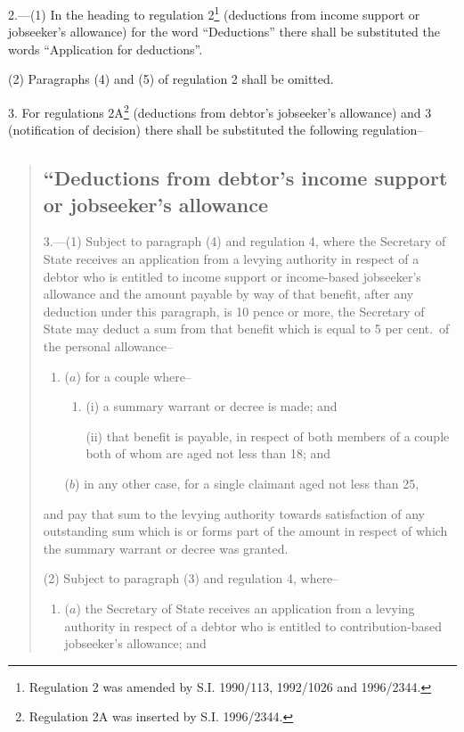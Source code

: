 \documentclass[12pt,a4paper]{article}
\begin{document}
2.---(1)  In the heading to regulation 2\footnote{\frenchspacing Regulation 2 was amended by S.I. 1990/113, 1992/1026 and 1996/2344.} (deductions from income support or jobseeker’s allowance) for the word “Deductions” there shall be substituted the words “Application for deductions”.

(2) Paragraphs (4) and (5) of regulation 2 shall be omitted.

\medskip

3.  For regulations 2A\footnote{\frenchspacing Regulation 2A was inserted by S.I. 1996/2344.} (deductions from debtor’s jobseeker’s allowance) and 3 (notification of decision) there shall be substituted the following regulation–
\begin{quotation}
\subsection*{“Deductions from debtor’s income support or jobseeker’s allowance}

3.---(1)  Subject to paragraph (4) and regulation 4, where the Secretary of State receives an application from a levying authority in respect of a debtor who is entitled to income support or income-based jobseeker’s allowance and the amount payable by way of that benefit, after any deduction under this paragraph, is 10 pence or more, the Secretary of State may deduct a sum from that benefit which is equal to 5 per cent.\ of the personal allowance–
\begin{enumerate}\item[]
($a$) for a couple where–
\begin{enumerate}\item[]
(i) a summary warrant or decree is made; and

(ii) that benefit is payable, in respect of both members of a couple both of whom are aged not less than 18; and
\end{enumerate}

($b$) in any other case, for a single claimant aged not less than 25,
\end{enumerate}
and pay that sum to the levying authority towards satisfaction of any outstanding sum which is or forms part of the amount in respect of which the summary warrant or decree was granted.

(2) Subject to paragraph (3) and regulation 4, where–
\begin{enumerate}\item[]
($a$) the Secretary of State receives an application from a levying authority in respect of a debtor who is entitled to contribution-based jobseeker’s allowance; and


\end{enumerate}
\end{quotation}
\end{document}
